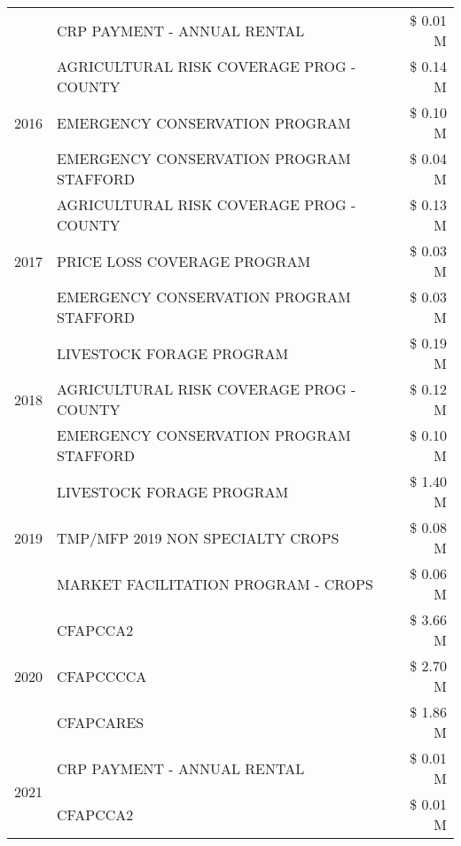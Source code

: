 \begin{tabular}{llr}
 & CRP PAYMENT - ANNUAL RENTAL & \$ 0.01 M \\
\cline{1-3}
\multirow[t]{3}{*}{2016} & AGRICULTURAL RISK COVERAGE PROG - COUNTY & \$ 0.14 M \\
 & EMERGENCY CONSERVATION PROGRAM & \$ 0.10 M \\
 & EMERGENCY CONSERVATION PROGRAM STAFFORD & \$ 0.04 M \\
\cline{1-3}
\multirow[t]{3}{*}{2017} & AGRICULTURAL RISK COVERAGE PROG - COUNTY & \$ 0.13 M \\
 & PRICE LOSS COVERAGE PROGRAM & \$ 0.03 M \\
 & EMERGENCY CONSERVATION PROGRAM STAFFORD & \$ 0.03 M \\
\cline{1-3}
\multirow[t]{3}{*}{2018} & LIVESTOCK FORAGE PROGRAM & \$ 0.19 M \\
 & AGRICULTURAL RISK COVERAGE PROG - COUNTY & \$ 0.12 M \\
 & EMERGENCY CONSERVATION PROGRAM STAFFORD & \$ 0.10 M \\
\cline{1-3}
\multirow[t]{3}{*}{2019} & LIVESTOCK FORAGE PROGRAM & \$ 1.40 M \\
 & TMP/MFP 2019 NON SPECIALTY CROPS & \$ 0.08 M \\
 & MARKET FACILITATION PROGRAM - CROPS & \$ 0.06 M \\
\cline{1-3}
\multirow[t]{3}{*}{2020} & CFAPCCA2 & \$ 3.66 M \\
 & CFAPCCCCA & \$ 2.70 M \\
 & CFAPCARES & \$ 1.86 M \\
\cline{1-3}
\multirow[t]{2}{*}{2021} & CRP PAYMENT - ANNUAL RENTAL & \$ 0.01 M \\
 & CFAPCCA2 & \$ 0.01 M \\
\cline{1-3}
\bottomrule
\end{tabular}
